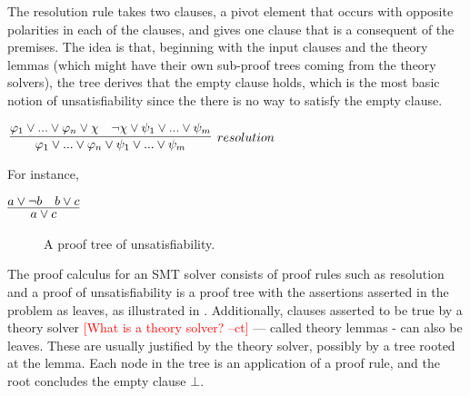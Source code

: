 \documentclass{article}
\newcommand{\rem}[1]{\textcolor{red}{[#1]}}
\newcommand{\ct}[1]{\rem{#1 --ct}}
\begin{document}
	The resolution rule takes two clauses, a pivot element 
	that occurs with opposite polarities in each of the 
	clauses, and gives one clause that is a consequent 
	of the premises. The idea is that, beginning 
	with the input clauses and the theory lemmas (which might 
	have their own sub-proof trees coming from the theory solvers), 
	the tree derives that the empty clause holds, which is the 
	most basic notion of unsatisfiability since the there 
	is no way to satisfy the empty clause.
	
	\begin{center}
		$\infer[resolution]{\varphi_1 \lor ... \lor \varphi_n \lor 
			\psi_1 \lor ... \lor \psi_m}
		{\varphi_1 \lor ... \lor \varphi_n \lor \chi & \neg \chi 
			\lor \psi_1 \lor ... \lor \psi_m}$ 
	\end{center}
	For instance,
	\begin{center}
		$\infer{a \lor c}{a \lor \neg b & b \lor c}$
	\end{center}
	
	\begin{figure}[t]
		\caption{A proof tree of unsatisfiability.}
		\label{fig:tree}
	\end{figure}

	The proof calculus for an SMT solver consists 
	of proof rules such as resolution and a 
	proof of unsatisfiability is a proof tree with 
	the assertions asserted in the problem as 
	leaves, as illustrated in .
	Additionally, clauses asserted to 
	be true by a theory solver \ct{What is a theory solver?}
	 --- called theory lemmas 
	- can also be leaves. These are usually 
	justified by the theory solver, possibly by 
	a tree rooted at the lemma. Each node in 
	the tree is an application of a proof rule, 
	and the root concludes the empty clause $\bot$.
	
\end{document}
